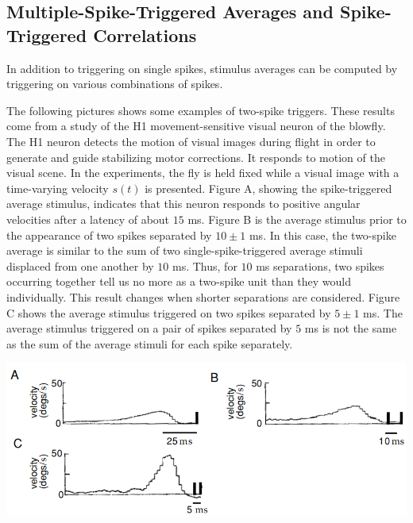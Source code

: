 \subsection{Multiple-Spike-Triggered Averages and Spike-Triggered Correlations}
\begin{rem}
  In addition to triggering on single spikes, stimulus averages can be computed by triggering on various combinations of spikes.
\end{rem}
\begin{exm}
  The following pictures shows some examples of two-spike triggers. These results come from a study of the H1 movement-sensitive visual neuron of the blowfly. The H1 neuron detects the motion of visual images during flight in order to generate and guide stabilizing motor corrections. It responds to motion of the visual scene. In the experiments, the fly is held fixed while a visual image with a time-varying velocity $s(t)$ is presented.
  Figure A, showing the spike-triggered average stimulus, indicates that this neuron responds to positive angular velocities after a latency of about $15$ ms.
  Figure B is the average stimulus prior to the appearance of two spikes separated by $10 \pm 1$ ms. In this case, the two-spike average is similar to the sum of two single-spike-triggered average stimuli displaced from one another by $10$ ms. Thus, for $10$ ms separations, two spikes occurring together tell us no more as a two-spike unit than they would individually. This result changes when shorter separations are considered.
  Figure C shows the average stimulus triggered on two spikes separated by $5 \pm 1$ ms. The average stimulus triggered on a pair of spikes separated by $5$ ms is not the same as the sum of the average stimuli for each spike separately. \par 
  \begin{center}
    \includegraphics[scale=0.3]{./png/1.10-blowflyH1neuron.png}
    \label{fig:1.10}    
  \end{center}
\end{exm}
